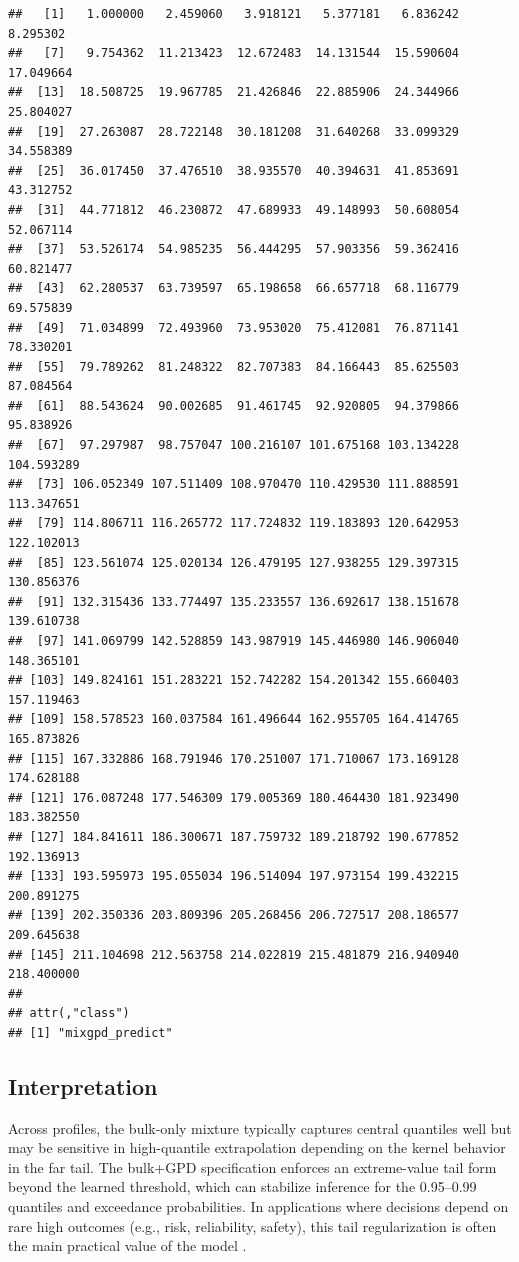 \documentclass[article]{jss}\usepackage[]{graphicx}\usepackage[]{xcolor}
\makeatletter
\newenvironment{kframe}{%
 \def\at@end@of@kframe{}%
 \ifinner\ifhmode%
  \def\at@end@of@kframe{\end{minipage}}%
  \begin{minipage}{\columnwidth}%
 \fi\fi%
 \def\FrameCommand##1{\hskip\@totalleftmargin \hskip-\fboxsep
 \colorbox{shadecolor}{##1}\hskip-\fboxsep
     \hskip-\linewidth \hskip-\@totalleftmargin \hskip\columnwidth}%
 \MakeFramed {\advance\hsize-\width
   \@totalleftmargin\z@ \linewidth\hsize
   \@setminipage}}%
 {\par\unskip\endMakeFramed%
 \at@end@of@kframe}
\newenvironment{knitrout}{}{} %
\makeatother
\begin{document}
\begin{knitrout}
\begin{kframe}
\begin{verbatim}
##   [1]   1.000000   2.459060   3.918121   5.377181   6.836242   8.295302
##   [7]   9.754362  11.213423  12.672483  14.131544  15.590604  17.049664
##  [13]  18.508725  19.967785  21.426846  22.885906  24.344966  25.804027
##  [19]  27.263087  28.722148  30.181208  31.640268  33.099329  34.558389
##  [25]  36.017450  37.476510  38.935570  40.394631  41.853691  43.312752
##  [31]  44.771812  46.230872  47.689933  49.148993  50.608054  52.067114
##  [37]  53.526174  54.985235  56.444295  57.903356  59.362416  60.821477
##  [43]  62.280537  63.739597  65.198658  66.657718  68.116779  69.575839
##  [49]  71.034899  72.493960  73.953020  75.412081  76.871141  78.330201
##  [55]  79.789262  81.248322  82.707383  84.166443  85.625503  87.084564
##  [61]  88.543624  90.002685  91.461745  92.920805  94.379866  95.838926
##  [67]  97.297987  98.757047 100.216107 101.675168 103.134228 104.593289
##  [73] 106.052349 107.511409 108.970470 110.429530 111.888591 113.347651
##  [79] 114.806711 116.265772 117.724832 119.183893 120.642953 122.102013
##  [85] 123.561074 125.020134 126.479195 127.938255 129.397315 130.856376
##  [91] 132.315436 133.774497 135.233557 136.692617 138.151678 139.610738
##  [97] 141.069799 142.528859 143.987919 145.446980 146.906040 148.365101
## [103] 149.824161 151.283221 152.742282 154.201342 155.660403 157.119463
## [109] 158.578523 160.037584 161.496644 162.955705 164.414765 165.873826
## [115] 167.332886 168.791946 170.251007 171.710067 173.169128 174.628188
## [121] 176.087248 177.546309 179.005369 180.464430 181.923490 183.382550
## [127] 184.841611 186.300671 187.759732 189.218792 190.677852 192.136913
## [133] 193.595973 195.055034 196.514094 197.973154 199.432215 200.891275
## [139] 202.350336 203.809396 205.268456 206.727517 208.186577 209.645638
## [145] 211.104698 212.563758 214.022819 215.481879 216.940940 218.400000
## 
## attr(,"class")
## [1] "mixgpd_predict"
\end{verbatim}
\end{kframe}
\end{knitrout}

\subsection{Interpretation}

Across profiles, the bulk-only mixture typically captures central quantiles well but may be sensitive in high-quantile extrapolation depending on the kernel behavior in the far tail.
The bulk+GPD specification enforces an extreme-value tail form beyond the learned threshold, which can stabilize inference for the 0.95--0.99 quantiles and exceedance probabilities.
In applications where decisions depend on rare high outcomes (e.g., risk, reliability, safety), this tail regularization is often the main practical value of the model \citep{Pickands1975, DeHaanFerreira2006}.
\end{document}

